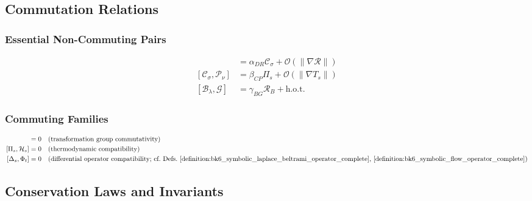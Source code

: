\subsection{Commutation Relations}
\label{subsec:bk6_commutation_relations}

\subsubsection*{Essential Non-Commuting Pairs}
\label{subsubsec:bk6_essential_non_commuting_pairs}
\begin{align}
[D_\lambda, R_\lambda] &= \alpha_{DR} \mathcal{C}_\sigma + \mathcal{O}(\|\nabla \mathcal{R}\|)\\
[\mathcal{C}_\sigma, \mathcal{P}_\nu] &= \beta_{CP} \Pi_s + \mathcal{O}(\|\nabla T_s\|)\\
[\mathcal{B}_\lambda, \mathcal{G}] &= \gamma_{BG} \mathcal{R}_B + \text{h.o.t.}
\end{align}

\subsubsection*{Commuting Families}
\label{subsubsec:bk6_commuting_families}
\begin{align}
[T_\alpha, T_\beta] &= 0 \quad \text{(transformation group commutativity)}\\
[\Pi_s, \mathcal{H}_s] &= 0 \quad \text{(thermodynamic compatibility)}\\
[\Delta_s, \Phi_t] &= 0 \quad \text{(differential operator compatibility; cf.~Defs.~\ref{definition:bk6_symbolic_laplace_beltrami_operator_complete}, \ref{definition:bk6_symbolic_flow_operator_complete})}
\end{align}

\subsection{Conservation Laws and Invariants}
\label{subsec:bk6_conservation_laws_invariants}

